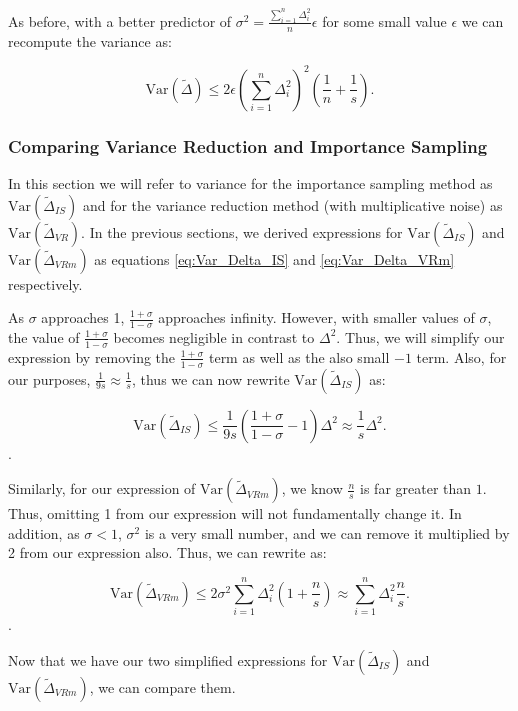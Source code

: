 \documentclass[11pt, margin=1in]{article}
\begin{document}
As before, with a better predictor of $\sigma^2 = \frac{\sum_{i = 1}^{n}\Delta_i^2}{n} \epsilon$ for some small value $\epsilon$ we can recompute the variance as:

\[
\mathrm{Var}\left(\tilde{\Delta}\right) \leq 2\epsilon\left(\sum_{i = 1}^{n}\Delta_i^2\right)^2\left(\frac{1}{n} + \frac{1}{s}\right).
\]

\subsubsection{Comparing Variance Reduction and Importance Sampling}
\label{appendix:variance-comparison}

In this section we will refer to variance for the importance sampling method as $\mathrm{Var}\left(\tilde{\Delta}_{IS}\right)$ and for the variance reduction method (with multiplicative noise) as $\mathrm{Var}\left(\tilde{\Delta}_{VR}\right)$.
In the previous sections, we derived expressions for $\mathrm{Var}\left(\tilde{\Delta}_{IS}\right)$ and $\mathrm{Var}\left(\tilde{\Delta}_{VRm}\right)$ as equations \eqref{eq:Var_Delta_IS} and \eqref{eq:Var_Delta_VRm} respectively.

As $\sigma$ approaches 1, $\frac{1 + \sigma}{1 - \sigma}$ approaches infinity.
However, with smaller values of $\sigma$, the value of $\frac{1 + \sigma}{1 - \sigma}$ becomes negligible in contrast to $\Delta^2$.
Thus, we will simplify our expression by removing the $\frac{1 + \sigma}{1 - \sigma}$ term as well as the also small $-1$ term.
Also, for our purposes, $\frac{1}{9s} \approx \frac{1}{s}$, thus we can now rewrite $\mathrm{Var}\left(\tilde{\Delta}_{IS}\right)$ as:

\[
\mathrm{Var}\left(\tilde{\Delta}_{IS}\right) \leq \frac{1}{9s} \left(\frac{1 + \sigma}{1 - \sigma} - 1\right) \Delta^2 \approx \frac{1}{s} \Delta^2.
\].

Similarly, for our expression of $\mathrm{Var}\left(\tilde{\Delta}_{VRm}\right)$, we know $\frac{n}{s}$ is far greater than $1$.
Thus, omitting 1 from our expression will not fundamentally change it.
In addition, as $\sigma < 1$, $\sigma^2$ is a very small number, and we can remove it multiplied by 2 from our expression also.
Thus, we can rewrite as:

\[
\mathrm{Var}\left(\tilde{\Delta}_{VRm}\right) \leq 2\sigma^2\sum_{i = 1}^{n} \Delta_i^2\left(1 + \frac{n}{s}\right) \approx \sum_{i = 1}^{n} \Delta_i^2\frac{n}{s}.
\].

Now that we have our two simplified expressions for $\mathrm{Var}\left(\tilde{\Delta}_{IS}\right)$ and $\mathrm{Var}\left(\tilde{\Delta}_{VRm}\right)$, we can compare them.
\end{document}
